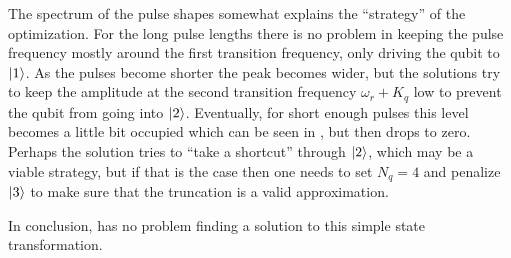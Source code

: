 \documentclass[main.tex]{subfiles}
\begin{document}
The spectrum of the pulse shapes somewhat explains the ``strategy'' of the optimization.
For the long pulse lengths there is no problem in keeping the pulse frequency mostly around the first transition frequency, only driving the qubit to \(\ket{1}\).
As the pulses become shorter the peak becomes wider, but the solutions try to keep the amplitude at the second transition frequency \(\omega_r+K_q\) low to prevent the qubit from going into \(\ket{2}\).
Eventually, for short enough pulses this level becomes a little bit occupied which can be seen in , but then drops to zero.
Perhaps the solution tries to ``take a shortcut'' through \(\ket{2}\), which may be a viable strategy, but if that is the case then one needs to set \(N_q = 4\) and penalize \(\ket{3}\) to make sure that the truncation is a valid approximation.

In conclusion, \krotov{} has no problem finding a solution to this simple state transformation.
\end{document}
